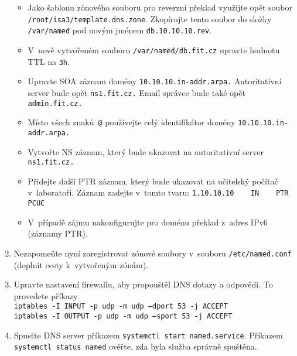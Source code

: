 \begin{enumerate}
    \begin{itemize}
      \item Jako šablonu zónového souboru pro reverzní překlad využijte opět soubor\\ {\tt /root/isa3/template.dns.zone}.
            Zkopírujte tento soubor do složky {\tt /var/named} pod novým jménem {\tt db.10.10.10.rev}.
      \item V~nově vytvořeném souboru {\tt /var/named/db.fit.cz} upravte hodnotu TTL na {\tt 3h}.
      \item Upravte SOA záznam domény {\tt 10.10.10.in-addr.arpa.} Autoritativní server bude opět {\tt ns1.fit.cz.}
            Email správce bude také opět {\tt admin.fit.cz.}
      \item Místo všech znaků~{\tt @} používejte celý identifikátor domény {\tt 10.10.10.in-addr.arpa.}
      \item Vytvořte NS záznam, který bude ukazovat na autoritativní server {\tt ns1.fit.cz.}
      \item Přidejte další PTR záznam, který bude ukazovat na učitelský počítač v~laboratoři. Záznam zadejte v~tomto tvaru:
            \verb|1.10.10.10    IN    PTR    PCUC|
      \item V~případě zájmu nakonfigurujte pro doménu překlad z~adres IPv6 (záznamy PTR).
    \end{itemize} 
    
  \item Nezapomeňte nyní zaregistrovat zónové soubory v~souboru {\tt /etc/named.conf} (doplnit cesty k~vytvořeným zónám).
  \item Upravte nastavení firewallu, aby propouštěl DNS dotazy a odpovědi. To provedete příkazy \\{\tt iptables -I INPUT -p udp -m udp --dport 53 -j ACCEPT}\\
        {\tt iptables -I OUTPUT -p udp -m udp --sport 53 -j ACCEPT}

  \item Spusťte DNS server příkazem {\tt systemctl start named.service}.
    Příkazem {\tt systemctl status named} ověřte, zda byla služba správně spuštěna.


\end{enumerate}
